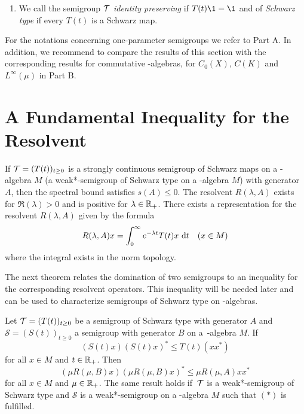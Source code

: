 \begin{enumerate}[1., wide, labelsep=1em]
\item
We call the semigroup $ \mathcal{T} $ \emph{identity preserving} if $ T(t)\1 = \1 $ and of \emph{Schwarz type} if every $ T(t) $ is a Schwarz map.

\end{enumerate}
For the notations concerning one-parameter semigroups we refer to Part A.
In addition, we recommend to compare the results of this section with the corresponding results for commutative \CA-algebras, \ie for $ C_{0}(X) $, $ C(K) $ and $ L^\infty(\mu) $ in Part B.
\section{A Fundamental Inequality for the Resolvent}\label{sec:d1-2}
If $ \mathcal{T} = (T(t))_{t \geq 0} $ is a strongly continuous semigroup of Schwarz maps on a \CA-algebra $ M $ (\resp a weak*-semigroup of Schwarz type on a \WA-algebra $ M $) with generator $ A $, then the spectral bound satisfies $ s(A) \leq 0 $.
The resolvent $ R(\lambda, A) $ exists for $ \Re(\lambda) > 0 $ and is positive for $ \lambda \in \mathbb{R}_{+} $.
There exists a representation for the resolvent $ R(\lambda,A) $ given by the formula
\[
 	R(\lambda,A)x = \int_{0}^\infty e^{-\lambda t} T(t)x \, \mathop{}\!\mathrm{d}{t}  \quad (x \in M)
\]
where the integral exists in the norm topology.

The next theorem relates the domination of two semigroups to an inequality for the corresponding resolvent operators.
This inequality will be needed later and can be used to characterize semigroups of Schwarz type on \CA-algebras.
\begin{theorem}\label{thm:d1-2.1}
Let $  \mathcal{T}  = (T(t))_{t\geq0} $ be a semigroup of Schwarz type with generator $ A $ and $ \mathcal{S} = (S(t))_{t\geq0} $ a semigroup with generator $ B $ on a\, \CA-algebra $ M $.
If
\begin{equation}
	(S(t)x)(S(t)x)^{*} \leq T(t)(xx^{*}) \tag{*}
\end{equation}
for all $ x \in M $ and $ t \in \mathbb{R}_{+} $. 
Then 
\[
	\left( \mu R(\mu,B)x \right) \left( \mu R(\mu,B)x \right)^{*} \leq \mu R(\mu,A)xx^{*}
\]
for all $ x \in M $ and $ \mu \in \mathbb{R}_{+} $.
The same result holds if $ \,\mathcal{T} $ is a weak*-semigroup of Schwarz type and $ \mathcal{S} $ is a weak*-semigroup on a \WA-algebra $ M $ such that $ (*) $ is fulfilled.
\end{theorem}

